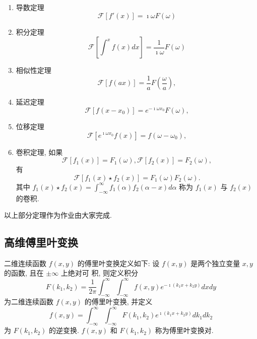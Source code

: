 \begin{enumerate}
    \item 导数定理
    \begin{equation}
        \mathcal{F} [f'(x)] = \imath \omega F(\omega)
    \end{equation}

    \item 积分定理
    \begin{equation}
        \mathcal{F} [ \int^{x} f(x) dx ] = \frac{1}{\imath \omega} F(\omega)
    \end{equation}

    \item 相似性定理
    \begin{equation}
        \mathcal{F} [ f(ax) ] = \frac{1}{a} F(\frac{\omega}{a}),
    \end{equation}
    \item 延迟定理
    \begin{equation}
        \mathcal{F} [ f(x - x_0 ) ] = e^{-\imath \omega x_0} F(\omega),
    \end{equation}
    \item 位移定理
    \begin{equation}
        \mathcal{F} [ e^{\imath \omega x_0} f(x) ] = f(\omega - \omega_0),
    \end{equation}
    \item 卷积定理, 如果
    \[
        \mathcal{F} [f_1(x)] =  F_1(\omega), \mathcal{F} [f_2(x)] =  F_2(\omega), 
    \]
    有
    \begin{equation}
        \mathcal{F} [f_1(x)\star f_2(x) ] = F_1(\omega) F_2(\omega).
    \end{equation}
    其中 $f_1(x) \star f_2(x)=\int_{-\infty}^{\infty} f_1(\alpha) f_2(\alpha-x) d \alpha$ 称为 $f_1(x)$ 与 $f_2(x)$ 的卷积.
\end{enumerate}
以上部分定理作为作业由大家完成.
\subsection{高维傅里叶变换}

二维连续函数 $f(x, y)$ 的傅里叶变换定义如下:
设 $f(x, y)$ 是两个独立变量 $x, y$ 的函数, 且在 $\pm \infty$ 上绝对可 积, 则定义积分
$$
F\left(k_1, k_2\right)=\frac{1}{2 \pi} \int_{-\infty}^{\infty} \int_{-\infty}^{\infty} f(x, y) e^{-\imath\left(k_1 x+k_2 y\right)} d x d y
$$
为二维连续函数 $f(x, y)$ 的傅里叶变换, 并定义
$$
f(x, y)=\int_{-\infty}^{\infty} \int_{-\infty}^{\infty} F\left(k_1, k_2\right) e^{\imath\left(k_1 x+k_2 y\right)} d k_1 d k_2
$$
为 $F\left(k_1, k_2\right)$ 的逆变换.
$f(x, y)$ 和 $F\left(k_1, k_2\right)$ 称为傅里叶变换对.

